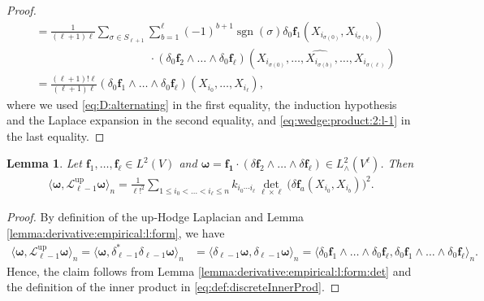 \documentclass[10pt]{article}
\DeclareMathOperator{\up}{up}
\theoremstyle{plain}
\newtheorem{lemma}{Lemma}
\theoremstyle{definition}
\theoremstyle{remark}
\begin{document}
\begin{proof}
\begin{align*}
            &=\frac{1}{(\ell+1)\ell}\sum_{\sigma\in S_{\ell+1}}\sum_{b=1}^\ell(-1)^{b+1}\operatorname{sgn}(\sigma)\delta_0\mathbf{f}_{1}(X_{i_{\sigma(0)}},X_{i_{\sigma(b)}})\\
            &\qquad\qquad\qquad\qquad\qquad\cdot(\delta_0\mathbf{f}_2\wedge\dots\wedge \delta_0\mathbf{f}_\ell)(X_{i_{\sigma(0)}},\dots,\widehat{X_{i_{\sigma(b)}}},\dots,X_{i_{\sigma(\ell)}})\\
            &=\frac{(\ell+1)!\ell}{(\ell+1)\ell}(\delta_0\mathbf{f}_1\wedge\dots\wedge \delta_0\mathbf{f}_\ell)(X_{i_0},\dots,X_{i_\ell}),
        \end{align*}
       where we used \eqref{eq:D:alternating} in the first equality, the induction hypothesis and the Laplace expansion in the second equality, and \eqref{eq:wedge:product:2:l-1} in the last equality.
    \end{proof}

    \begin{lemma}\label{lemma:representation:Dirichlet:form:empirical:l:form}
    Let $\mathbf{f}_1,\dots,\mathbf{f}_\ell\in L^2(V)$ and $\boldsymbol{\omega}=\mathbf{f_1}\cdot(\delta\mathbf{f}_2\wedge\dots\wedge \delta\mathbf{f_\ell})\in L^2_\wedge(V^{\ell})$. Then 
    \begin{align*}
        \langle\boldsymbol{\omega},\mathscr{L}_{\ell-1}^{\up}\boldsymbol{\omega}\rangle_n=\frac{1}{\ell!^2}\sum_{1\leq i_0<\dots<i_\ell\leq n}k_{i_0\cdots i_\ell}\det_{\ell\times\ell}\big( \delta\mathbf{f}_a(X_{i_0},X_{i_b})\big)^2.
    \end{align*}
    \end{lemma}

    \begin{proof}
        By definition of the up-Hodge Laplacian and Lemma \ref{lemma:derivative:empirical:l:form}, we have
        \begin{align*}
            \langle\boldsymbol{\omega},\mathscr{L}_{\ell-1}^{\up}\boldsymbol{\omega}\rangle_n=\langle\boldsymbol{\omega},\delta_{\ell-1}^*\delta_{\ell-1}\boldsymbol{\omega}\rangle_n&=\langle\delta_{\ell-1}\boldsymbol{\omega},\delta_{\ell-1}\boldsymbol{\omega}\rangle_n=\langle\delta_0\mathbf{f}_1\wedge\dots\wedge \delta_0\mathbf{f}_\ell,\delta_0\mathbf{f}_1\wedge\dots\wedge \delta_0\mathbf{f}_\ell\rangle_n.
        \end{align*}
        Hence, the claim follows from Lemma \ref{lemma:derivative:empirical:l:form:det} and the definition of the inner product in \eqref{eq:def:discreteInnerProd}.
    \end{proof}
\end{document}
